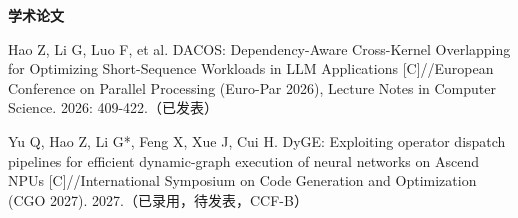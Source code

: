 \noindent\textbf{学术论文}

\begin{list}{}{\setlength{\leftmargin}{2em}\setlength{\labelwidth}{1.5em}\setlength{\labelsep}{0.5em}\setlength{\itemindent}{0em}\setlength{\itemsep}{4pt}\setlength{\parsep}{0pt}\setlength{\topsep}{4pt}}
\item[{[1]}] Hao Z, Li G, Luo F, et al. DACOS: Dependency-Aware Cross-Kernel Overlapping for Optimizing Short-Sequence Workloads in LLM Applications [C]//European Conference on Parallel Processing (Euro-Par 2026), Lecture Notes in Computer Science. 2026: 409-422.（已发表）
\item[{[2]}] Yu Q, Hao Z, Li G*, Feng X, Xue J, Cui H. DyGE: Exploiting operator dispatch pipelines for efficient dynamic-graph execution of neural networks on Ascend NPUs [C]//International Symposium on Code Generation and Optimization (CGO 2027). 2027.（已录用，待发表，CCF-B）
\end{list}
